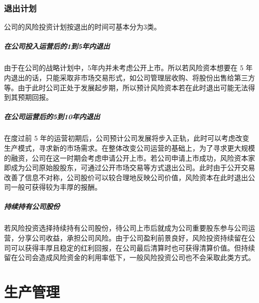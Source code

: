 \documentclass[violet]{main}
\begin{document}
			\subsection{退出计划}
				公司的风险投资计划按退出的时间可基本分为3类。
				\paragraph{在公司投入运营后的1到5年内退出}
					由于在公司的战略计划中，5年内并未考虑公开上市。所以若风险资本想要在 5 年内退出的话，只能采取非市场交易形式，如公司管理层收购、将股份出售给第三方等。由于此时公司正处于发展起步期，所以预计风险资本若在此时退出可能无法得到其预期回报。
				\paragraph{在公司运营后的5到10年内退出}
					在度过前 5 年的运营初期后，公司预计公司发展将步入正轨，此时可以考虑改变生产模式，寻求新的市场需求。在整体改变公司运营的基础上，为了寻求更大规模的融资，公司在这一时期会考虑申请公开上市。若公司申请上市成功，风险资本家即成为公司原始股股东，可通过公开市场交易等方式退出公司。此时由于公开交易改善了信息不对称，公司股价可以较合理地反映公司价值，风险资本在此时退出公司一般可获得较为丰厚的报酬。
				\paragraph{持续持有公司股份}
					若风险投资选择持续持有公司股份，待公司上市后就成为公司重要股东参与公司运营，分享公司收益，承担公司风险。由于公司盈利前景良好，风险投资持续留在公司可以获得丰厚且稳定的红利回报，在公司最后清算时也可获得清算价值。但持续留在公司会造成风险资金的利用率低下，一般风险投资公司也不会采取此类方式。
	\chapter{生产管理}
\end{document}
